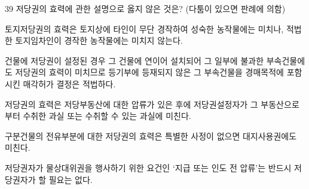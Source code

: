 \begin{question}{39}
저당권의 효력에 관한 설명으로 옳지 않은 것은? (다툼이 있으면 판례에 의함)
\begin{choices}
  \item 토지저당권의 효력은 토지상에 타인이 무단 경작하여 성숙한 농작물에는 미치나, 적법한 토지임차인이 경작한 농작물에는 미치지 않는다.
  \item 건물에 저당권이 설정된 경우 그 건물에 연이어 설치되어 그 일부에 불과한 부속건물에도 저당권의 효력이 미치므로 등기부에 등재되지 않은 그 부속건물을 경매목적에 포함시킨 매각허가 결정은 적법하다.
  \item 저당권의 효력은 저당부동산에 대한 압류가 있은 후에 저당권설정자가 그 부동산으로부터 수취한 과실 또는 수취할 수 있는 과실에 미친다.
  \item 구분건물의 전유부분에 대한 저당권의 효력은 특별한 사정이 없으면 대지사용권에도 미친다.
  \item 저당권자가 물상대위권을 행사하기 위한 요건인 ‘지급 또는 인도 전 압류’는 반드시 저당권자가 할 필요는 없다.
\end{choices}
\end{question}
